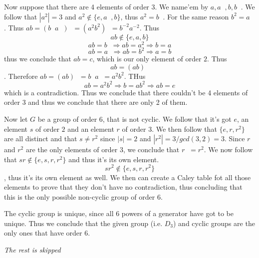 \documentclass[11pt,oneside,titlepage]{book}
\DeclareMathOperator \inv {^{-1}}
\DeclareMathOperator \ra {\Rightarrow}
\newcommand{\set}[1]{\{ #1 \}}
\begin{document}
Now suppose that there are 4 elements of order 3. We name'em by $a, a\inv, b, b\inv$. We follow
that $|a^2| = 3$ and $a^2 \notin \set{e, a\inv, b}$, thus $a^2 = b\inv$. For the same
reason $b^2 = a\inv$. Thus $ab = (b\inv a\inv)\inv = (a^2 b^2)\inv = b^{-2} a^{-2}$. Thus
$$ab \notin \set{e, a, b}$$
$$ab = b\inv \ra ab = a^2 \ra b = a$$
$$ab = a\inv \ra ab = b^2 \ra a = b$$
thus we conclude that $ab = c$, which is our only element of order $2$. Thus
$$ab = (ab)\inv$$.
Therefore $ab = (ab)\inv = b\inv a\inv = a^2 b^2$. THus
$$ab = a^2 b^2 \ra b = ab^2 \ra ab = e$$
which is a contradiction. Thus we conclude that there couldn't be 4 elements of order 3 and thus
we conclude that there are only 2 of them.

Now let $G$ be a group of order $6$, that is not cyclic. We follow that it's got $e$, an
element $s$ of order $2$ and an element $r$ of order $3$. We then follow that
$\set{e, r, r^2}$ are all distinct and that $s \neq r^2$ since $|s| = 2$ and
$|r^2| = 3/gcd(3, 2) = 3$. Since $r$ and $r^2$ are the only elements of order $3$, we conclude
that $r\inv = r^2$. We now follow that $sr \notin \set{e, s, r, r^2}$ and thus it's its own element.
$$sr^2 \notin \set{e, s, r, r^2}$$, thus it's its own element as well. We then can create
a Caley table fot all those elements to prove that they don't have no contradiction, thus concluding
that this is the only possible non-cyclic group of order $6$.

The cyclic group is unique, since all 6 powers of a generator have got to be unique. Thus we
conclude that the given group (i.e. $D_3$) and cyclic groups are the only ones that have
order $6$.

\textit{The rest is skipped}
\end{document}
